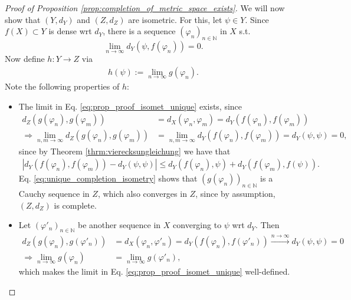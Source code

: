 \documentclass[12pt, a4paper]{article}
\numberwithin{equation}{section}
\theoremstyle{definition}
\theoremstyle{definition}
\newcommand{\abs}[1]{\left\vert #1 \right\vert}
\newcommand{\seq}[1][\varphi]{\left( #1 \right)_{n \in \mathbb{N}}}
\begin{document}
\begin{proof}[Proof of Proposition \ref{prop:completion_of_metric_space_exists}]
		We will now show that $(Y, d_Y)$ and $(Z, d_Z)$ are isometric. For this, let $\psi\in Y$. Since $f(X)\subset Y$ is dense wrt $d_Y$, there is a sequence $\seq[\varphi_n]$ in $X$ s.t. $$\lim\limits_{n\to\infty}d_Y(\psi, f(\varphi_n)) = 0.$$ Now define $h: Y\to Z$ via
		\begin{align}\label{eq:prop_proof_isomet_unique}
			h(\psi) := \lim\limits_{n\to\infty}g(\varphi_n).
		\end{align}
		Note the following properties of $h$:
		\begin{itemize}
			\item The limit in Eq. \eqref{eq:prop_proof_isomet_unique} exists, since
			\begin{align}
				d_Z(g(\varphi_n), g(\varphi_m)) &= d_X(\varphi_n, \varphi_m) = d_Y(f(\varphi_n), f(\varphi_m))
				\\ \label{eq:unique_completion_isometry} \Rightarrow \lim\limits_{n, m\to\infty}d_Z(g(\varphi_n), g(\varphi_m)) &= \lim\limits_{n, m\to\infty} d_Y(f(\varphi_n), f(\varphi_m)) = d_Y(\psi, \psi) = 0,
			\end{align}
			since by Theorem \ref{thrm:vierecksungleichung} we have that
			\begin{align*}
				\abs{d_Y(f(\varphi_n), f(\varphi_m)) - d_Y(\psi, \psi)} \leq d_Y(f(\varphi_n), \psi) + d_Y(f(\varphi_m), f(\psi)).
			\end{align*}
			Eq. \eqref{eq:unique_completion_isometry} shows that $\seq[g(\varphi_n)]$ is a Cauchy sequence in $Z$, which also converges in $Z$, since by assumption, $(Z, d_Z)$ is complete.
			
			\item Let $\seq[\varphi'_n]$ be another sequence in $X$ converging to $\psi$ wrt $d_Y$. Then
			\begin{align*}
				d_Z(g(\varphi_n), g(\varphi'_n)) &= d_X(\varphi_n, \varphi'_n) = d_Y(f(\varphi_n), f(\varphi'_n)) \overset{n\to\infty}{\longrightarrow} d_Y(\psi, \psi) = 0
				\\ \Rightarrow \lim\limits_{n\to\infty}g(\varphi_n) &= \lim\limits_{n\to\infty}g(\varphi'_n),
			\end{align*}
			which makes the limit in Eq. \eqref{eq:prop_proof_isomet_unique} well-defined.
			

\end{itemize}
\end{proof}
\end{document}
